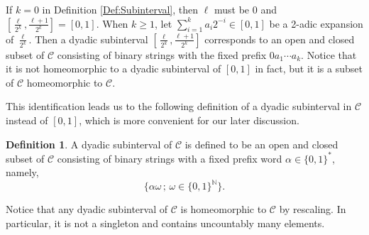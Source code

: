 \documentclass[12pt,reqno]{amsart}
\theoremstyle{plain}
\theoremstyle{definition}
\newtheorem{definition}{Definition}[section]
\theoremstyle{remark}
\numberwithin{equation}{section}
\begin{document}
If  $k = 0$  in Definition \ref{Def:Subinterval}, 
then  $\ell$  must be  $0$  and  $\left[ \frac{\ell}{2^k}, \frac{\ell+1}{2^k}\right] = [0, 1]$.    
When  $k \geq 1$, 
let  $\sum_{i=1}^{k} a_i 2^{-i} \in [0, 1]$    	
be a 2-adic expansion of  $\frac{\ell}{2^k}$.   
Then a dyadic subinterval  $\left[ \frac{\ell}{2^k}, \frac{\ell+1}{2^k}\right]$  
corresponds to 
an open and closed subset of  $\mathcal{C}$  
consisting of binary strings with the fixed prefix  $0a_1 \cdots a_k$.   
Notice that it is not homeomorphic to a dyadic subinterval of  $[0, 1]$  in fact, 
but it is a subset of  $\mathcal{C}$  homeomorphic to  $\mathcal{C}$.  

This identification leads us to the following %
definition of a dyadic subinterval in  $\mathcal{C}$  instead of  $[0, 1]$,  
which is more convenient for our later discussion.  

\begin{definition} 
	A dyadic subinterval of  $\mathcal{C}$  is defined to be 
	an open and closed subset of  $\mathcal{C}$  
	consisting of binary strings with a fixed prefix word  $ \alpha \in \{ 0, 1 \}^*$,  
	namely,  
	\begin{equation*} 
		\{ \alpha \omega \, ; \, \omega \in \{ 0, 1 \}^{\mathbb{N}} \}. 
	\end{equation*}   
\end{definition} 	 
	
Notice that any dyadic subinterval of  $\mathcal{C}$  is homeomorphic to  $\mathcal{C}$  
by rescaling. 
In particular, 
it is not a singleton and contains uncountably many elements.  
\end{document}
